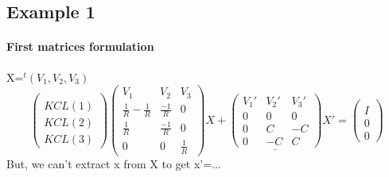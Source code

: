 \subsection{Example 1}
\begin{figure}[h]
\centerline{
 \scalebox{0.5}{
    
 }
}
\end{figure}
\paragraph{First matrices formulation}
X=$^{t}(V_{1},V_{2},V_{3})$\\
\[\left(\begin{array}{c}
  \\
  KCL(1)\\  KCL(2)\\  KCL(3)
  \end{array}\right)
\left(\begin{array}{ccc}
  V_{1}&V_{2}&V_{3}\\
  \hline
  \frac{1}{R}-\frac{1}{R}&  \frac{-1}{R}&0\\
  \frac{1}{R}&  \frac{-1}{R}&0\\
  0&0&\frac{1}{R}
\end{array}\right)X+
\underline{
\left(\begin{array}{ccc}
   V_{1}'&V_{2}'&V_{3}'\\
  \hline
0&0&0\\
  0&C&-C\\
  0&-C&C
\end{array}\right)}X'=
\left(\begin{array}{c}
  \\
  I\\
  0\\
  0
  \end{array}\right)
\]
But, we can't extract x from X to get x'=...\\
\newline
